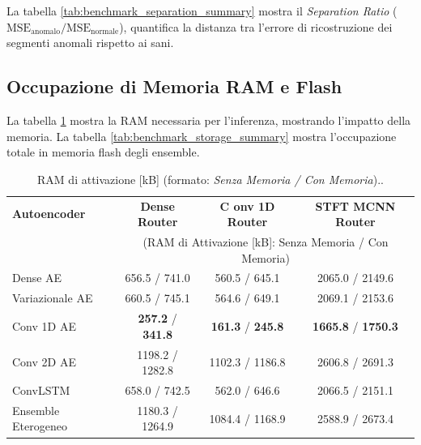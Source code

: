 La tabella \ref{tab:benchmark_separation_summary} mostra il \emph{Separation Ratio} ($\text{MSE}_{\text{anomalo}} / \text{MSE}_{\text{normale}}$), quantifica la distanza tra l'errore di ricostruzione dei segmenti anomali rispetto ai sani.


\subsection{Occupazione di Memoria RAM e Flash}
La tabella \ref{tab:benchmark_ram_summary} mostra la RAM necessaria per l'inferenza, mostrando l'impatto della memoria. 
La tabella \ref{tab:benchmark_storage_summary} mostra l'occupazione totale in memoria flash degli ensemble.

\begin{table}[H]
	\centering
	\begin{tabular}{lccc}
		\toprule
		\textbf{Autoencoder} & \textbf{Dense Router} & \textbf{C onv 1D Router} & \textbf{STFT MCNN Router} \\
		& \multicolumn{3}{c}{\small (RAM di Attivazione [kB]: Senza Memoria / Con Memoria)} \\
		\midrule
		Dense AE            & 656.5 / 741.0   & 560.5 / 645.1   & 2065.0 / 2149.6 \\
		Variazionale AE     & 660.5 / 745.1   & 564.6 / 649.1   & 2069.1 / 2153.6 \\
		Conv 1D AE          & \textbf{257.2} / \textbf{341.8} & \textbf{161.3} / \textbf{245.8} & \textbf{1665.8} / \textbf{1750.3} \\
		Conv 2D AE          & 1198.2 / 1282.8 & 1102.3 / 1186.8 & 2606.8 / 2691.3 \\
		ConvLSTM            & 658.0 / 742.5   & 562.0 / 646.6   & 2066.5 / 2151.1 \\
		Ensemble Eterogeneo & 1180.3 / 1264.9 & 1084.4 / 1168.9 & 2588.9 / 2673.4 \\
		\bottomrule
	\end{tabular}
	\caption{RAM di attivazione [kB] (formato: \emph{Senza Memoria / Con Memoria})..}
	\label{tab:benchmark_ram_summary}
\end{table}


